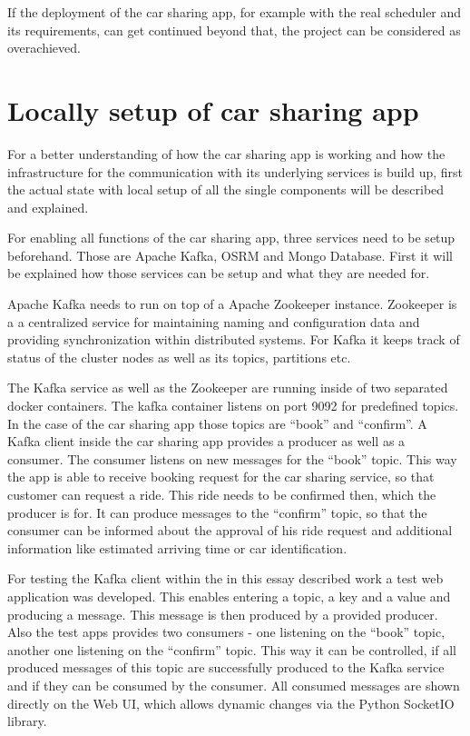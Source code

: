 If the deployment of the car sharing app, for example with the real scheduler and its requirements, can get continued beyond that, the project can be considered as overachieved.

\section{Locally setup of car sharing app}

For a better understanding of how the car sharing app is working and how the infrastructure for the communication with its underlying services is build up, first the   actual state with local setup of all the single components will be described and explained.

For enabling all functions of the car sharing app, three services need to be setup beforehand. Those are Apache Kafka, OSRM and Mongo Database. First it will be explained how those services can be setup and what they are needed for.

Apache Kafka needs to run on top of a Apache Zookeeper instance. Zookeeper is a a centralized service for maintaining naming and configuration data and providing synchronization within distributed systems. For Kafka it keeps track of status of the cluster nodes as well as its topics, partitions etc.


The Kafka service as well as the Zookeeper are running inside of two separated docker containers. The kafka container listens on port 9092 for predefined topics. In the case of the car sharing app those topics are ``book'' and ``confirm''. A Kafka client inside the car sharing app provides a producer as well as a consumer. The consumer listens on new messages for the ``book'' topic. This way the app is able to receive booking request for the car sharing service, so that customer can request a ride. This ride needs to be confirmed then, which the producer is for. It can produce messages to the ``confirm'' topic, so that the consumer can be informed about the approval of his ride request and additional information like estimated arriving time or car identification.

For testing the Kafka client within the in this essay described work a test web application was developed. This enables entering a topic, a key and a value and producing a message. This message is then produced by a provided producer.  Also the test apps provides two consumers - one listening on the ``book'' topic, another one listening on the ``confirm'' topic. This way it can be controlled, if all produced messages of this topic are successfully produced to the Kafka service and if they can be consumed by the consumer. All consumed messages are shown directly on the Web UI, which allows dynamic changes via the Python SocketIO library.

